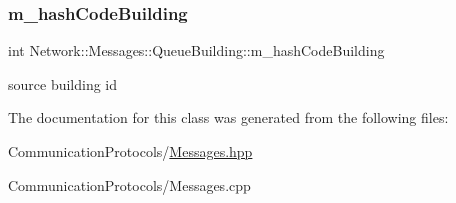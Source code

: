 \subsubsection{\texorpdfstring{m\+\_\+hash\+Code\+Building}{m\_hashCodeBuilding}}
{\footnotesize\ttfamily int Network\+::\+Messages\+::\+Queue\+Building\+::m\+\_\+hash\+Code\+Building}

source building id 

The documentation for this class was generated from the following files\+:\begin{DoxyCompactItemize}
\item 
Communication\+Protocols/\hyperlink{_messages_8hpp}{Messages.\+hpp}\item 
Communication\+Protocols/Messages.\+cpp\end{DoxyCompactItemize}
